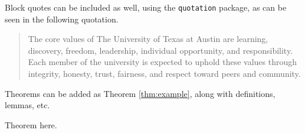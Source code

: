 Block quotes can be included as well, using the \verb|quotation| package, as can be seen in the following quotation.
\begin{quotation}
The core values of The University of Texas at Austin are learning, discovery, freedom, leadership, individual opportunity, and responsibility. Each member of the university is expected to uphold these values through integrity, honesty, trust, fairness, and respect toward peers and community.
\end{quotation}

Theorems can be added as Theorem \ref{thm:example}, along with definitions, lemmas, etc.
\begin{thm}
\label{thm:example}
Theorem here.
\end{thm}
